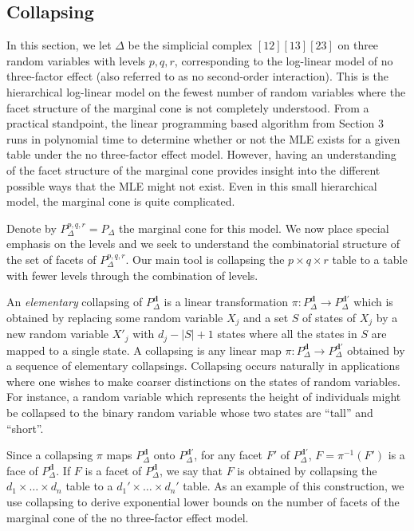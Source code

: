\documentclass{elsart}
\newcommand{\bd}{{\mathbf d}}
\begin{document}
\subsection{Collapsing}
In this section, we let $\Delta$ be the simplicial
complex $[12][13][23]$ on three random variables with levels $p, q,
r$, corresponding to the 
log-linear  model of no three-factor effect (also referred to as no
second-order interaction).   
This is the hierarchical log-linear model on the
fewest number of random variables where the  facet structure of the
marginal cone is not
completely understood.  From a practical standpoint, the linear
programming based algorithm from Section 3 runs in polynomial time to
determine whether or not the MLE exists for a given table under  the
no three-factor 
effect model.  However, having an understanding of the facet
structure of the marginal cone provides insight into the different
possible ways that the MLE might not exist.  Even in this small
hierarchical model, the marginal cone is quite complicated.   

Denote by $P_\Delta^{p,q,r}= P_\Delta$ the
marginal cone for this model.  We now place special emphasis on
the levels and we seek to understand the
combinatorial structure of the set of facets of $P_\Delta^{p,q,r}$.
Our main tool is collapsing the $p\times q \times r$ table to a table
with fewer levels through the combination of levels.  


An {\it elementary}  collapsing of $P^\bd_\Delta$ is a linear transformation
$\pi \colon P_\Delta^{\bd} \to P_\Delta^{\bd'}$ which is obtained by
replacing some random variable $X_j$ and a set $S$ of states of $X_j$
by a new random variable $X'_j$ with $d_j - |S| + 1$ states where all
the states in $S$ are mapped to a single state.  A collapsing is any
linear map $\pi 
\colon P_\Delta^{\bd} \to P_\Delta^{\bd'}$ obtained by a sequence of
elementary collapsings.  Collapsing occurs naturally in applications
where one wishes to make coarser distinctions on the states of random
variables.  For instance, a random variable which represents the
height of individuals might be collapsed to the binary random variable
whose two states are ``tall'' and ``short''.

Since a collapsing $\pi$ maps $P^\bd_\Delta$
onto $P_\Delta^{\bd'}$, for any facet $F'$ of $P_\Delta^{\bd'}$, $F =
\pi^{-1}(F')$ is a face of $P_\Delta^{\bd}$.  If $F$ is a
facet of $P_\Delta^{\bd}$, we say that $F$ is obtained by collapsing
the $d_1 \times \dots \times d_n$ table to a $d_1' \times \dots \times
d_n'$ table.  As an example of this construction, we use collapsing to
derive exponential lower bounds on the number of facets of the
marginal cone of the no three-factor effect model.
\end{document}

